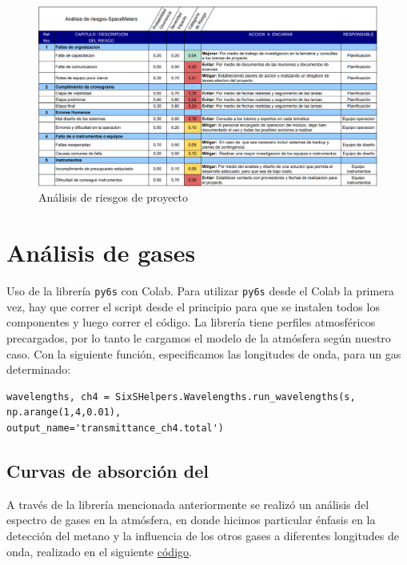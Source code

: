 \documentclass[titlepage,11pt]{article}
\begin{document}
\begin{figure}[htb!]
    \includegraphics[width=18cm]{fig/riesgos.png}
    \caption{Análisis de riesgos de proyecto}
    \label{fig:my_label}
\end{figure}




\newpage
\section{Análisis de gases}

Uso de la librería \texttt{py6s} con Colab.
Para utilizar \texttt{py6s} desde el Colab la primera vez, hay que correr el script desde el principio para que se instalen todos los componentes y luego correr el código. La librería tiene perfiles atmosféricos precargados, por lo tanto le cargamos el modelo de la atmósfera según nuestro caso.
Con la siguiente función, especificamos las longitudes de onda, para un gas determinado:

\begin{lstlisting}
wavelengths, ch4 = SixSHelpers.Wavelengths.run_wavelengths(s, np.arange(1,4,0.01),
output_name='transmittance_ch4.total')
\end{lstlisting}

\subsection{Curvas de absorción del \metano}

A través de la librería mencionada anteriormente se realizó un análisis del espectro de gases en la atmósfera, en donde hicimos particular énfasis en la detección del metano y la influencia de los otros gases a diferentes longitudes de onda, realizado en el siguiente \href{https://drive.google.com/open?id=1dH4wrmwYlQlsIZE5aXH2mcc7xXUcFgpj}{código}.
\end{document}
